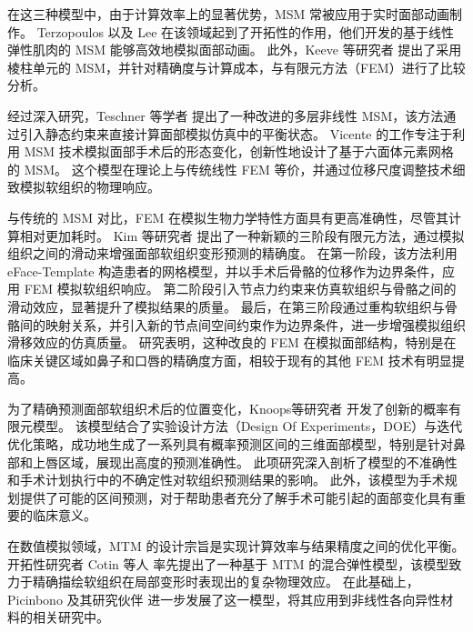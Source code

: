 在这三种模型中，由于计算效率上的显著优势，MSM 常被应用于实时面部动画制作。
Terzopoulos \cite{terzopoulosPhysicallyBasedFacial1990} 以及 Lee \cite{leeRealisticModelingFacial1995} 在该领域起到了开拓性的作用，他们开发的基于线性弹性肌肉的 MSM 能够高效地模拟面部动画。
此外，Keeve 等研究者 \cite{keeveDeformableModelingFacial1998} 提出了采用棱柱单元的 MSM，并针对精确度与计算成本，与有限元方法（FEM）进行了比较分析。

经过深入研究，Teschner 等学者 \cite{teschnerDirectComputationNonlinear} 提出了一种改进的多层非线性 MSM，该方法通过引入静态约束来直接计算面部模拟仿真中的平衡状态。
Vicente \cite{vicenteMaxillofacialSurgerySimulation2009} 的工作专注于利用 MSM 技术模拟面部手术后的形态变化，创新性地设计了基于六面体元素网格的 MSM。
这个模型在理论上与传统线性 FEM 等价，并通过位移尺度调整技术细致模拟软组织的物理响应。

与传统的 MSM 对比，FEM 在模拟生物力学特性方面具有更高准确性，尽管其计算相对更加耗时。
Kim 等研究者 \cite{kimClinicallyValidatedPrediction2017} 提出了一种新颖的三阶段有限元方法，通过模拟组织之间的滑动来增强面部软组织变形预测的精确度。
在第一阶段，该方法利用 eFace-Template \cite{zhangEFacetemplateMethodEfficiently2016} 构造患者的网格模型，并以手术后骨骼的位移作为边界条件，应用 FEM 模拟软组织响应。
第二阶段引入节点力约束来仿真软组织与骨骼之间的滑动效应，显著提升了模拟结果的质量。
最后，在第三阶段通过重构软组织与骨骼间的映射关系，并引入新的节点间空间约束作为边界条件，进一步增强模拟组织滑移效应的仿真质量。
研究表明，这种改良的 FEM 在模拟面部结构，特别是在临床关键区域如鼻子和口唇的精确度方面，相较于现有的其他 FEM 技术有明显提高。

为了精确预测面部软组织术后的位置变化，Knoops等研究者 \cite{knoopsNovelSoftTissue2018} 开发了创新的概率有限元模型。
该模型结合了实验设计方法（Design Of Experiments，DOE）与迭代优化策略，成功地生成了一系列具有概率预测区间的三维面部模型，特别是针对鼻部和上唇区域，展现出高度的预测准确性。
此项研究深入剖析了模型的不准确性和手术计划执行中的不确定性对软组织预测结果的影响。
此外，该模型为手术规划提供了可能的区间预测，对于帮助患者充分了解手术可能引起的面部变化具有重要的临床意义。

在数值模拟领域，MTM 的设计宗旨是实现计算效率与结果精度之间的优化平衡。
开拓性研究者 Cotin 等人 \cite{cotinHybridElasticModel2000} 率先提出了一种基于 MTM 的混合弹性模型，该模型致力于精确描绘软组织在局部变形时表现出的复杂物理效应。
在此基础上，Picinbono 及其研究伙伴 \cite{picinbonoNonlinearAnisotropicElasticity2003} 进一步发展了这一模型，将其应用到非线性各向异性材料的相关研究中。

